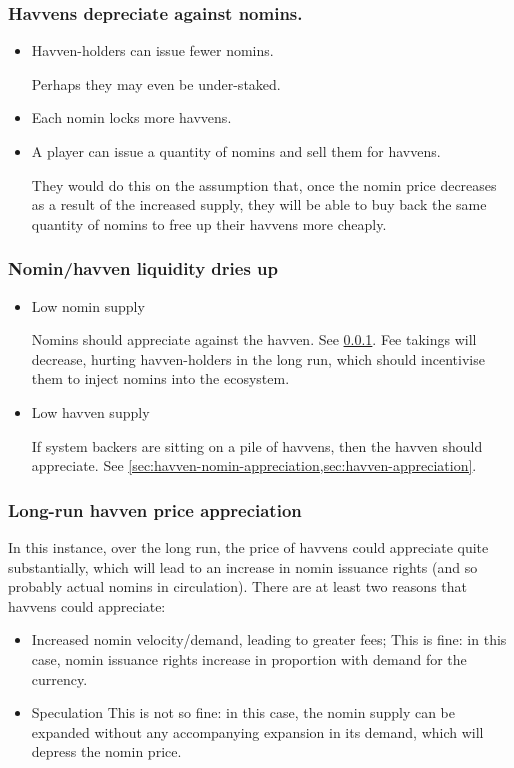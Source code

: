 \subsubsection{Havvens depreciate against nomins.} \label{sec:havven-nomin-depreciation}

\begin{itemize}
	\item{Havven-holders can issue fewer nomins.}
	
	Perhaps they may even be under-staked.

	\item{Each nomin locks more havvens.}
	\item{A player can issue a quantity of nomins and sell them for havvens.}
		  
	They would do this on the assumption that, once the nomin price decreases as a result of the increased
	supply, they will be able to buy back the same quantity of nomins to free up their
	havvens more cheaply.
\end{itemize}

\subsubsection{Nomin/havven liquidity dries up}
\begin{itemize}
	\item Low nomin supply

	Nomins should appreciate against the havven. See \cref{sec:havven-nomin-depreciation}.
	Fee takings will decrease, hurting havven-holders in the long run,
	which should incentivise them to inject nomins into the ecosystem.

	\item Low havven supply

	If system backers are sitting on a pile of havvens, then the havven should
	appreciate. See \cref{sec:havven-nomin-appreciation,sec:havven-appreciation}.
\end{itemize}


\subsubsection{Long-run havven price appreciation}\label{sec:havven-appreciation}
In this instance, over the long run, the price of havvens could appreciate quite substantially,
which will lead to an increase in nomin issuance rights (and so probably actual nomins in circulation).
There are at least two reasons that havvens could appreciate:
\begin{itemize}
	\item Increased nomin velocity/demand, leading to greater fees;
	This is fine: in this case, nomin issuance rights increase in proportion with demand for the currency.

	\item Speculation
	This is not so fine: in this case, the nomin supply can be expanded without any accompanying
	expansion in its demand, which will depress the nomin price.
\end{itemize}

